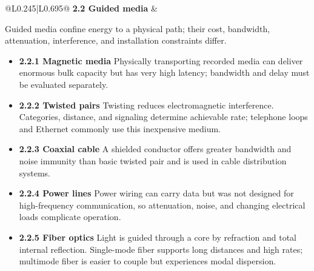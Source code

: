 \documentclass[10pt,letterpaper]{article}
\begin{document}
\begin{longtable}{@{}L{0.245\textwidth}|L{0.695\textwidth}@{}}
\textbf{2.2 Guided media} & \begin{minipage}[t]{\linewidth}\raggedright Guided media confine energy to a physical path; their cost, bandwidth, attenuation, interference, and installation constraints differ.\par\begin{itemize}\item \textbf{2.2.1 Magnetic media} Physically transporting recorded media can deliver enormous bulk capacity but has very high latency; bandwidth and delay must be evaluated separately.\item \textbf{2.2.2 Twisted pairs} Twisting reduces electromagnetic interference. Categories, distance, and signaling determine achievable rate; telephone loops and Ethernet commonly use this inexpensive medium.\item \textbf{2.2.3 Coaxial cable} A shielded conductor offers greater bandwidth and noise immunity than basic twisted pair and is used in cable distribution systems.\item \textbf{2.2.4 Power lines} Power wiring can carry data but was not designed for high-frequency communication, so attenuation, noise, and changing electrical loads complicate operation.\item \textbf{2.2.5 Fiber optics} Light is guided through a core by refraction and total internal reflection. Single-mode fiber supports long distances and high rates; multimode fiber is easier to couple but experiences modal dispersion.\end{itemize}\end{minipage} \\ \hline

\end{longtable}
\end{document}
